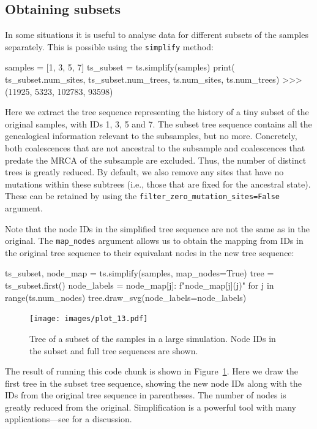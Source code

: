 \documentclass[graybox]{svmult}
\begin{document}
\subsection{Obtaining subsets}\label{obtaining-subsets}

In some situations it is useful to analyse data for different subsets of
the samples separately. This is possible using the \texttt{simplify}
method:

\begin{pythoncode}
samples = [1, 3, 5, 7]
ts_subset = ts.simplify(samples)
print(
    ts_subset.num_sites, ts_subset.num_trees,
    ts.num_sites, ts.num_trees)
>>> (11925, 5323, 102783, 93598)
\end{pythoncode}

Here we extract the tree sequence representing the history of a tiny
subset of the original samples, with IDs 1, 3, 5 and 7. The subset tree
sequence contains all the genealogical information relevant to the
subsamples, but no more. Concretely, both coalescences that are not ancestral to the
subsample and coalescences that predate
the MRCA of the subsample are excluded. Thus, the number of distinct trees is greatly
reduced. By default, we also remove any sites that have no mutations
within these subtrees (i.e., those that are fixed for the ancestral
state). These can be retained by using the
\texttt{filter\_zero\_mutation\_sites=False} argument.

Note that the node IDs in the simplified tree sequence are not the same as in the
original. The \texttt{map\_nodes} argument allows us to obtain the
mapping from IDs in the original tree sequence to their equivalant nodes
in the new tree sequence:

\begin{pythoncode}
ts_subset, node_map = ts.simplify(samples, map_nodes=True)
tree = ts_subset.first()
node_labels = {
    node_map[j]: f"{node_map[j]}({j})"
    for j in range(ts.num_nodes)}
tree.draw_svg(node_labels=node_labels)
\end{pythoncode}

\begin{figure}[t]
\centering
\texttt{[image: images/plot\_13.pdf]}
\caption{\label{fig-tree-subset} Tree of a subset of the samples in a large
simulation. Node IDs in the subset and full tree sequences are shown.}
\end{figure}

The result of running this code chunk is shown in Figure~\ref{fig-tree-subset}.
Here we draw the first tree in the subset tree sequence, showing the new
node IDs along with the IDs from the original tree sequence in
parentheses. The number of nodes is greatly reduced from the original.
Simplification is a powerful tool with many applications---see
\cite{wong2024general} for a discussion.
\end{document}
